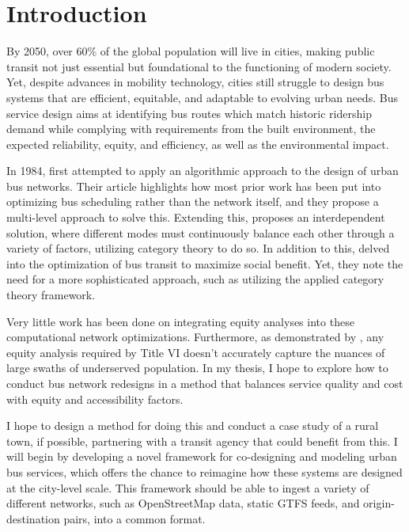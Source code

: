 \chapter{Introduction}


By 2050, over 60\% of the global population will live in cities, making public transit not just essential but foundational to the functioning of modern society. Yet, despite advances in mobility technology, cities still struggle to design bus systems that are efficient, equitable, and adaptable to evolving urban needs. Bus service design aims at identifying bus routes which match historic ridership demand while complying with requirements from the built environment, the expected reliability, equity, and efficiency, as well as the environmental impact.

In 1984, \textcite{ceder_bus_1986} first attempted to apply an algorithmic approach to the design of urban bus networks. Their article highlights how most prior work has been put into optimizing bus scheduling rather than the network itself, and they propose a multi-level approach to solve this. Extending this, \textcite{zardini_co-design_2023} proposes an interdependent solution, where different modes must continuously balance each other through a variety of factors, utilizing category theory to do so. In addition to this, \textcite{furth_setting_1981} delved into the optimization of bus transit to maximize social benefit. Yet, they note the need for a more sophisticated approach, such as utilizing the applied category theory framework. 

Very little work has been done on integrating equity analyses into these computational network optimizations. Furthermore, as demonstrated by \textcite{situ_is_2025}, any equity analysis required by Title VI doesn’t accurately capture the nuances of large swaths of underserved population. In my thesis, I hope to explore how to conduct bus network redesigns in a method that balances service quality and cost with equity and accessibility factors.

I hope to design a method for doing this and conduct a case study of a rural town, if possible, partnering with a transit agency that could benefit from this. I will begin by developing a novel framework for co-designing and modeling urban bus services, which offers the chance to reimagine how these systems are designed at the city-level scale. This framework should be able to ingest a variety of different networks, such as OpenStreetMap data, static GTFS feeds, and origin-destination pairs, into a common format. 
 
